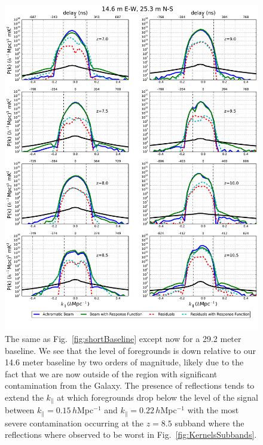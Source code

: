 \documentclass[twocolumn]{emulateapj}
\begin{document}
\begin{figure}
\includegraphics[width=\textwidth]{figures/ps_compare_nithya_lst4hr_1024ch_14p6ew_25p3ns.pdf}
\caption{The same as Fig.~\ref{fig:shortBaseline} except now for a 29.2 meter baseline. We see that the level of foregrounds is down relative to our 14.6 meter baseline by two orders of magnitude, likely due to the fact that we are now outside of the region with significant contamination from the Galaxy. The presence of reflections tends to extend the $k_\parallel$ at which foregrounds drop below the level of the signal between $k_\parallel=0.15$\,$h$Mpc$^{-1}$ and $k_\parallel=0.22$\,$h$Mpc$^{-1}$ with the most severe contamination occurring at the $z=8.5$ subband where the reflections where observed to be worst in Fig.~\ref{fig:KernelsSubbands}. }
\label{figure:shortBaseline}
\end{figure}
\end{document}
